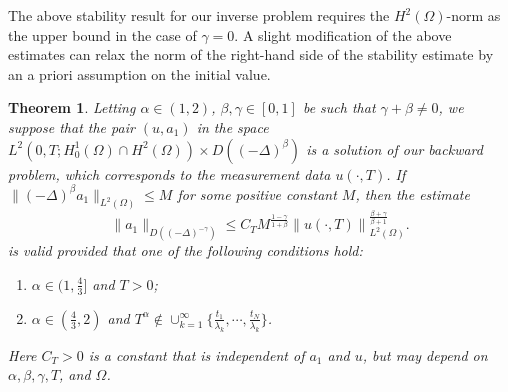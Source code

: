 \documentclass[11pt]{article}
\newtheorem{theorem}{Theorem}
\numberwithin{equation}{section}
\begin{document}
The above stability result for our inverse problem requires the $H^2(\Omega)$-norm as the upper bound in the case of $\gamma=0$. A slight modification of the above estimates can relax the norm of the right-hand side of the stability estimate by an a priori assumption on the initial value.
\begin{theorem}\label{thm-condi-sup}
Letting $\alpha\in(1,2)$, $\beta,\gamma\in [0,1]$ be such that $\gamma+\beta\neq0$, we suppose that the pair $(u,a_1)$ in the space $L^2 \left(0,T; H_0^1(\Omega) \cap H^2(\Omega) \right) \times D((-\Delta)^{\beta})$ is a solution of our backward problem, which corresponds to the measurement data $u(\cdot,T)$. If $\|(-\Delta)^{\beta} a_1\|_{L^2(\Omega)} \le M$ for some positive constant $M$, then the estimate
$$
\|a_1\|_{D((-\Delta)^{-\gamma})}\le  C_T M^{\frac{1-\gamma}{1+\beta}} \left\| u(\cdot, T)\right\|_{L^2(\Omega)}^{\frac{\beta+\gamma}{\beta+1}}.
$$
is valid provided that one of the following conditions hold:
\begin{enumerate}[label = \roman*.]
    \item $\alpha\in(1,\frac43]$ and $T>0$;
    \item $\alpha\in(\frac43,2)$ and $T^\alpha \not\in \cup_{k=1}^\infty \{ \frac{t_1}{\lambda_k}, \cdots, \frac{t_N}{\lambda_k}\}$.
\end{enumerate}
Here $C_T>0$ is a constant that is independent of $a_1$ and $u$, but may depend on $\alpha,\beta,\gamma,T$, and $\Omega$.
\end{theorem}
\end{document}
